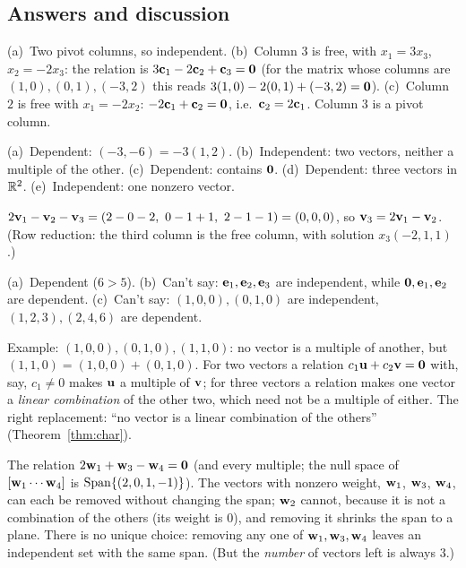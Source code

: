 \documentclass[11pt]{article}
\begin{document}
\subsection*{Answers and discussion}
\begin{description}[leftmargin=0pt,itemsep=5pt]
  \item[Knowledge Check \ref{kc:rref}.] (a)~Two pivot columns, so independent. (b)~Column $3$ is free, with $x_1=3x_3$, $x_2=-2x_3$: the relation is $3\mathbf{c}_1-2\mathbf{c}_2+\mathbf{c}_3=\mathbf{0}$ (for the matrix whose columns are $(1,0),(0,1),(-3,2)$ this reads $3(1,0)-2(0,1)+(-3,2)=\mathbf{0}$). (c)~Column $2$ is free with $x_1=-2x_2$: $-2\mathbf{c}_1+\mathbf{c}_2=\mathbf{0}$, i.e.\ $\mathbf{c}_2=2\mathbf{c}_1$. Column $3$ is a pivot column.
  \item[Knowledge Check \ref{kc:inspect}.] (a)~Dependent: $(-3,-6)=-3(1,2)$. (b)~Independent: two vectors, neither a multiple of the other. (c)~Dependent: contains $\mathbf{0}$. (d)~Dependent: three vectors in $\mathbb{R}^2$. (e)~Independent: one nonzero vector.
  \item[Knowledge Check \ref{kc:relation}.] $2\bv{v}_1-\bv{v}_2-\bv{v}_3=(2-0-2,\ 0-1+1,\ 2-1-1)=(0,0,0)$, so $\mathbf{v}_3=2\mathbf{v}_1-\mathbf{v}_2$. (Row reduction: the third column is the free column, with solution $x_3(-2,1,1)$.)
  \item[Knowledge Check \ref{kc:toomany}.] (a)~Dependent ($6>5$). (b)~Can't say: $\mathbf{e}_1,\mathbf{e}_2,\mathbf{e}_3$ are independent, while $\mathbf{0},\mathbf{e}_1,\mathbf{e}_2$ are dependent. (c)~Can't say: $(1,0,0),(0,1,0)$ are independent, $(1,2,3),(2,4,6)$ are dependent.
  \item[Pause and think \ref{think:multiples}.] Example: $(1,0,0),(0,1,0),(1,1,0)$: no vector is a multiple of another, but $(1,1,0)=(1,0,0)+(0,1,0)$. For two vectors a relation $c_1\mathbf{u}+c_2\mathbf{v}=\mathbf{0}$ with, say, $c_1\neq0$ makes $\mathbf{u}$ a multiple of $\mathbf{v}$; for three vectors a relation makes one vector a \emph{linear combination} of the other two, which need not be a multiple of either. The right replacement: ``no vector is a linear combination of the others'' (Theorem~\ref{thm:char}).
  \item[Pause and think \ref{think:redundant}.] The relation $2\mathbf{w}_1+\mathbf{w}_3-\mathbf{w}_4=\mathbf{0}$ (and every multiple; the null space of $[\mathbf{w}_1\cdots\mathbf{w}_4]$ is $\operatorname{Span}\{(2,0,1,-1)\}$). The vectors with nonzero weight, $\mathbf{w}_1$, $\mathbf{w}_3$, $\mathbf{w}_4$, can each be removed without changing the span; $\mathbf{w}_2$ cannot, because it is not a combination of the others (its weight is $0$), and removing it shrinks the span to a plane. There is no unique choice: removing any one of $\mathbf{w}_1,\mathbf{w}_3,\mathbf{w}_4$ leaves an independent set with the same span. (But the \emph{number} of vectors left is always $3$.)

\end{description}
\end{document}
